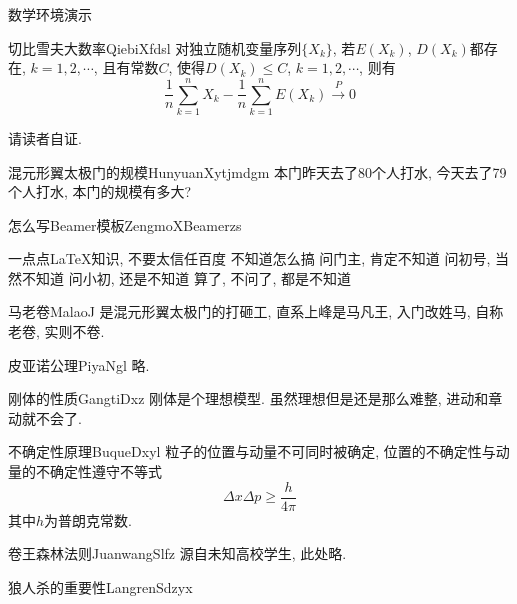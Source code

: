 \documentclass[hyperref,UTF8,11pt,CJK]{beamer}
\begin{document}
\begin{frame}{数学环境演示}
	\begin{scutheorem}{切比雪夫大数率}{QiebiXfdsl}
		对独立随机变量序列$\{X_k\}$, 若$E(X_k)$, $D(X_k)$都存在, $k=1,2,\cdots$, 且有常数$C$, 使得$D(X_k)\leq C$, $k=1,2,\cdots$, 则有
		\begin{equation}
		\dfrac{1}{n} \sum_{k=1}^{n} X_k - \dfrac{1}{n} \sum_{k=1}^{n} E(X_k) \stackrel{\;P\;}{\longrightarrow} 0
		\end{equation}
	\end{scutheorem}
	\begin{scuproof}{}{}
		请读者自证.
	\end{scuproof}
	\begin{scuexample}{混元形翼太极门的规模}{HunyuanXytjmdgm}
		本门昨天去了80个人打水, 今天去了79个人打水, 本门的规模有多大?
	\end{scuexample}
	\begin{scualgorithm}{怎么写Beamer模板}{ZengmoXBeamerzs}
		\begin{algorithmic}[1]
		\REQUIRE 一点点\LaTeX 知识, 不要太信任百度
		\ENSURE 不知道怎么搞
		\STATE 问门主, 肯定不知道
		\STATE 问初号, 当然不知道
		\STATE 问小初, 还是不知道
		\RETURN 算了, 不问了, 都是不知道
		\end{algorithmic}
	\end{scualgorithm}
	\begin{scudefinition}{马老卷}{MalaoJ}
		是混元形翼太极门的打砸工, 直系上峰是马凡王, 入门改姓马, 自称老卷, 实则不卷.
	\end{scudefinition}
	\begin{scuaxiom}{皮亚诺公理}{PiyaNgl}
		略.
	\end{scuaxiom}
	\begin{scuproperty}{刚体的性质}{GangtiDxz}
		刚体是个理想模型. 虽然理想但是还是那么难整, 进动和章动就不会了.
	\end{scuproperty}
	\begin{scuproposition}{不确定性原理}{BuqueDxyl}
		粒子的位置与动量不可同时被确定, 位置的不确定性与动量的不确定性遵守不等式
		\begin{equation}
			\Delta x \Delta p \geq \dfrac{h}{4\pi}
		\end{equation}
		其中$h$为普朗克常数.
	\end{scuproposition}
	\begin{sculemma}{卷王森林法则}{JuanwangSlfz}
		源自未知高校学生, 此处略.
	\end{sculemma}
	\begin{scucorollary}{狼人杀的重要性}{LangrenSdzyx}

\end{scucorollary}
\end{frame}
\end{document}
